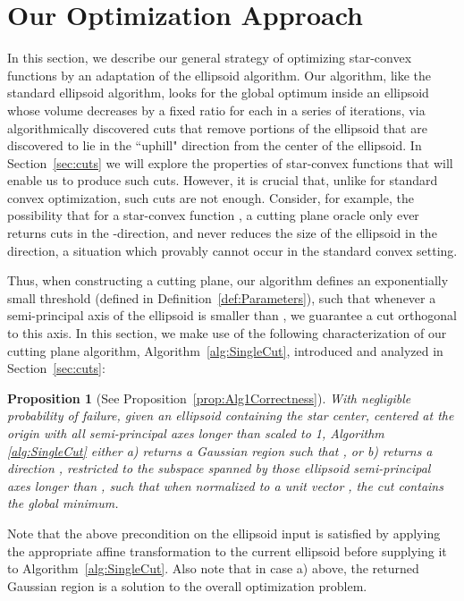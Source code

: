 \documentclass[11pt,letter]{article}
\numberwithin{nTheorems}{section}
\newtheorem*{proposition*}{Proposition}
\begin{document}
\section{Our Optimization Approach}\label{sec:ellipsoid}

In this section, we describe our general strategy of optimizing star-convex functions by an adaptation of the ellipsoid algorithm. Our algorithm, like the standard ellipsoid algorithm, looks for the global optimum inside an ellipsoid whose volume decreases by a fixed ratio for each in a series of iterations, via algorithmically discovered cuts that remove portions of the ellipsoid that are discovered to lie in the ``uphill" direction from the center of the ellipsoid.
In Section~\ref{sec:cuts} we will explore the properties of star-convex functions that will enable us to produce such cuts. However, it is crucial that, unlike for standard convex optimization, such cuts are not enough. Consider, for example, the possibility that for a star-convex function , a cutting plane oracle only ever returns cuts in the -direction, and never reduces the size of the ellipsoid in the  direction, a situation which provably cannot occur in the standard convex setting.

Thus, when constructing a cutting plane, our algorithm defines an exponentially small threshold  (defined in Definition~\ref{def:Parameters}), such that whenever a semi-principal axis of the ellipsoid is smaller than , we guarantee a cut orthogonal to this axis. In this section, we make use of the following characterization of our cutting plane algorithm, Algorithm~\ref{alg:SingleCut}, introduced and analyzed in Section~\ref{sec:cuts}:

\begin{proposition*}[See Proposition~\ref{prop:Alg1Correctness}]
With negligible probability of failure, given an ellipsoid containing the star center, centered at the origin with all semi-principal axes longer than  scaled to 1, Algorithm \ref{alg:SingleCut} either a) returns a Gaussian region  such that , or b) returns a direction , restricted to the subspace spanned by those ellipsoid semi-principal axes longer than , such that when normalized to a unit vector , the cut  contains the global minimum.
\end{proposition*}

Note that the above precondition on the ellipsoid input is satisfied by applying the appropriate affine transformation to the current ellipsoid before supplying it to Algorithm~\ref{alg:SingleCut}.
Also note that in case a) above, the returned Gaussian region is a solution to the overall optimization problem.
\end{document}
